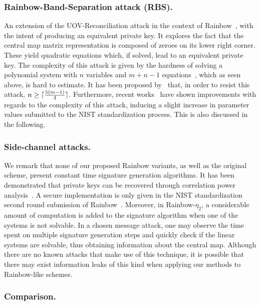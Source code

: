 \documentclass[12pt, a4paper, oneside]{memoir}
\DeclarePairedDelimiter{\ceil}{\lceil}{\rceil}
\theoremstyle{definition}
\begin{document}
\subsubsection{Rainbow-Band-Separation attack (RBS).}

An extension of the UOV-Reconciliation attack in the context of Rainbow~\cite{Ding:200806}, with the intent of producing an equivalent private key. It explores the fact that the central map matrix representation is composed of zeroes on its lower right corner. These yield quadratic equations which, if solved, lead to an equivalent private key. The complexity of this attack is given by the hardness of solving a polynomial system with $n$ variables and $m + n - 1$ equations~\cite[Thm.~3.30]{Thomae:201306}, which as seen above, is hard to estimate. It has been proposed by~\cite{Petzoldt:201005} that, in order to resist this attack, $n \geq \ceil{\frac{5 (m - 1)}{3}}$. Furthermore, recent works~\cite{Perlner:202006,Nakamura:202006} have shown improvements with regards to the complexity of this attack, inducing a slight increase in parameter values submitted to the NIST standardization process. This is also discussed in the following.

\subsubsection{Side-channel attacks.} 

We remark that none of our proposed Rainbow variants, as well as the original scheme, present constant time signature generation algorithms. It has been demonstrated that private keys can be recovered through correlation power analysis~\cite{Park:201808}. A secure implementation is only given in the NIST standardization second round submission of Rainbow~\cite{Ding:201901}. Moreover, in Rainbow-$\eta_2$, a considerable amount of computation is added to the signature algorithm when one of the systems is not solvable. In a chosen message attack, one may observe the time spent on multiple signature generation steps and quickly check if the linear systems are solvable, thus obtaining information about the central map. Although there are no known attacks that make use of this technique, it is possible that there may exist information leaks of this kind when applying our methods to Rainbow-like schemes.

\subsubsection{Comparison.}
\end{document}
